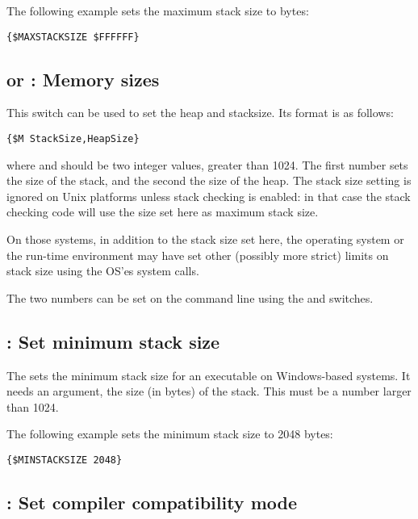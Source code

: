The following example sets the maximum stack size to bytes:
\begin{verbatim}
{$MAXSTACKSIZE $FFFFFF}
\end{verbatim}

\subsection{ or  : Memory sizes}

This switch can be used to set the heap and stacksize. Its format is as
follows:
\begin{verbatim}
{$M StackSize,HeapSize}
\end{verbatim}
where  and  should be two integer values,
greater than 1024. The first number sets the size of the stack, and the
second the size of the heap. The stack size setting is ignored on Unix
platforms unless stack checking is enabled: in that case the
stack checking code will use the size set here as maximum stack size.

On those systems, in addition to the stack size set here, the operating
system or the run-time environment may have set other (possibly more strict) 
limits on stack size using the OS'es  system calls.

The two numbers can be set on the command line using the 
and  switches.

\subsection{ : Set minimum stack size}
The  sets the minimum stack size for an executable
on Windows-based systems. It needs an argument, the size (in bytes) of the
stack. This must be a number larger than 1024.

The following example sets the minimum stack size to 2048 bytes:
\begin{verbatim}
{$MINSTACKSIZE 2048}
\end{verbatim}

\subsection{ : Set compiler compatibility mode}

